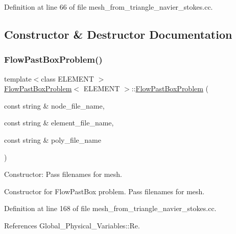 Definition at line 66 of file mesh\+\_\+from\+\_\+triangle\+\_\+navier\+\_\+stokes.\+cc.



\subsection{Constructor \& Destructor Documentation}
\mbox{\label{classFlowPastBoxProblem_a6b674c1028abcd6e54c50d939d25a00e}} 
\subsubsection{\texorpdfstring{Flow\+Past\+Box\+Problem()}{FlowPastBoxProblem()}}
{\footnotesize\ttfamily template$<$class E\+L\+E\+M\+E\+NT $>$ \\
\hyperlink{classFlowPastBoxProblem}{Flow\+Past\+Box\+Problem}$<$ E\+L\+E\+M\+E\+NT $>$\+::\hyperlink{classFlowPastBoxProblem}{Flow\+Past\+Box\+Problem} (\begin{DoxyParamCaption}\item[{const string \&}]{node\+\_\+file\+\_\+name,  }\item[{const string \&}]{element\+\_\+file\+\_\+name,  }\item[{const string \&}]{poly\+\_\+file\+\_\+name }\end{DoxyParamCaption})}



Constructor\+: Pass filenames for mesh. 

Constructor for Flow\+Past\+Box problem. Pass filenames for mesh. 

Definition at line 168 of file mesh\+\_\+from\+\_\+triangle\+\_\+navier\+\_\+stokes.\+cc.



References Global\+\_\+\+Physical\+\_\+\+Variables\+::\+Re.

\mbox{\label{classFlowPastBoxProblem_a48bb150799924e3d0ab42a610babefbd}} 
